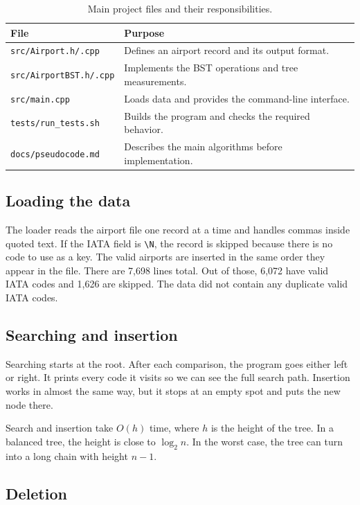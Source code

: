\documentclass[12pt]{article}
\begin{document}
\begin{table}[H]
\centering
\caption{Main project files and their responsibilities.}
\begin{tabular}{@{}p{}p{}@{}}
\toprule
\textbf{File} & \textbf{Purpose} \\
\midrule
\texttt{src/Airport.h/.cpp} & Defines an airport record and its output format. \\
\texttt{src/AirportBST.h/.cpp} & Implements the BST operations and tree measurements. \\
\texttt{src/main.cpp} & Loads data and provides the command-line interface. \\
\texttt{tests/run\_tests.sh} & Builds the program and checks the required behavior. \\
\texttt{docs/pseudocode.md} & Describes the main algorithms before implementation. \\
\bottomrule
\end{tabular}
\end{table}

\subsection{Loading the data}

The loader reads the airport file one record at a time and handles commas inside quoted text. If the IATA field is \texttt{\textbackslash N}, the record is skipped because there is no code to use as a key. The valid airports are inserted in the same order they appear in the file. There are 7,698 lines total. Out of those, 6,072 have valid IATA codes and 1,626 are skipped. The data did not contain any duplicate valid IATA codes.

\subsection{Searching and insertion}

Searching starts at the root. After each comparison, the program goes either left or right. It prints every code it visits so we can see the full search path. Insertion works in almost the same way, but it stops at an empty spot and puts the new node there.

Search and insertion take $O(h)$ time, where $h$ is the height of the tree. In a balanced tree, the height is close to $\log_2 n$. In the worst case, the tree can turn into a long chain with height $n-1$.

\subsection{Deletion}
\end{document}
